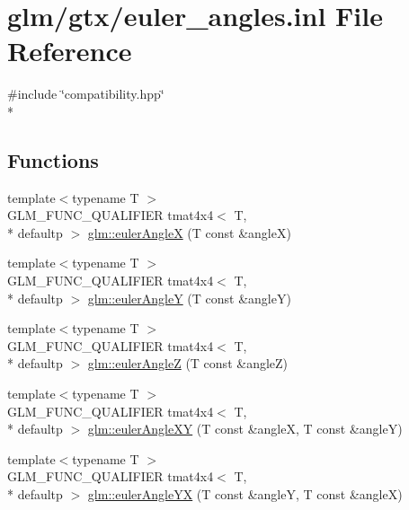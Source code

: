 \hypertarget{euler__angles_8inl}{\section{glm/gtx/euler\-\_\-angles.inl File Reference}
\label{euler__angles_8inl}
}
{\ttfamily \#include \char`\"{}compatibility.\-hpp\char`\"{}}\\*
\subsection*{Functions}
\begin{DoxyCompactItemize}
\item 
{\footnotesize template$<$typename T $>$ }\\G\-L\-M\-\_\-\-F\-U\-N\-C\-\_\-\-Q\-U\-A\-L\-I\-F\-I\-E\-R tmat4x4$<$ T, \\*
defaultp $>$ \hyperlink{group__gtx__euler__angles_ga82cd3b8a04943f1a0d1a562aff358dc8}{glm\-::euler\-Angle\-X} (T const \&angle\-X)
\item 
{\footnotesize template$<$typename T $>$ }\\G\-L\-M\-\_\-\-F\-U\-N\-C\-\_\-\-Q\-U\-A\-L\-I\-F\-I\-E\-R tmat4x4$<$ T, \\*
defaultp $>$ \hyperlink{group__gtx__euler__angles_gaeb193af1184bdf39c23636d756e1ff33}{glm\-::euler\-Angle\-Y} (T const \&angle\-Y)
\item 
{\footnotesize template$<$typename T $>$ }\\G\-L\-M\-\_\-\-F\-U\-N\-C\-\_\-\-Q\-U\-A\-L\-I\-F\-I\-E\-R tmat4x4$<$ T, \\*
defaultp $>$ \hyperlink{group__gtx__euler__angles_gab59c4fe7f735568255cc19fddd3ddfcd}{glm\-::euler\-Angle\-Z} (T const \&angle\-Z)
\item 
{\footnotesize template$<$typename T $>$ }\\G\-L\-M\-\_\-\-F\-U\-N\-C\-\_\-\-Q\-U\-A\-L\-I\-F\-I\-E\-R tmat4x4$<$ T, \\*
defaultp $>$ \hyperlink{group__gtx__euler__angles_ga8bf84f92ca976a7f50dbe4b30ceb72dd}{glm\-::euler\-Angle\-X\-Y} (T const \&angle\-X, T const \&angle\-Y)
\item 
{\footnotesize template$<$typename T $>$ }\\G\-L\-M\-\_\-\-F\-U\-N\-C\-\_\-\-Q\-U\-A\-L\-I\-F\-I\-E\-R tmat4x4$<$ T, \\*
defaultp $>$ \hyperlink{group__gtx__euler__angles_gafdd02f9a37511190962119adef5c1c25}{glm\-::euler\-Angle\-Y\-X} (T const \&angle\-Y, T const \&angle\-X)

\end{DoxyCompactItemize}
